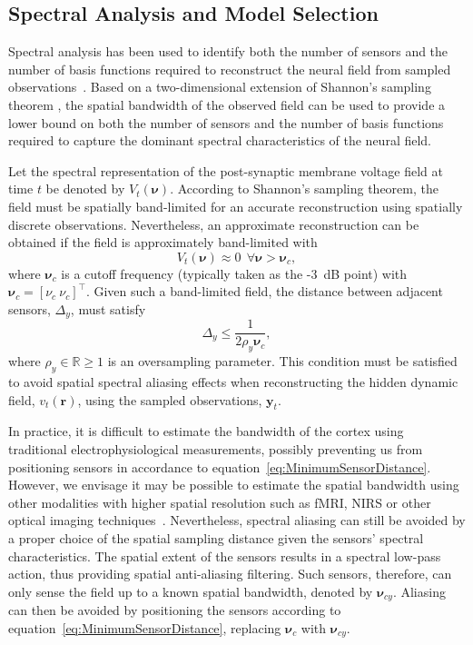 \documentclass[10pt]{article}
\begin{document}
\subsection{Spectral Analysis and Model Selection}\label{SpectralAnalysisSection} Spectral analysis has been used to identify both the number of sensors and the number of basis functions required to reconstruct the neural field from sampled observations~\cite{Sanner1992,Scerri2009}. Based on a two-dimensional extension of Shannon's sampling theorem \cite{Peterson1962}, the spatial bandwidth of the observed field can be used to provide a lower bound on both the number of sensors and the number of basis functions required to capture the dominant spectral characteristics of the neural field.

Let the spectral representation of the post-synaptic membrane voltage field at time $t$ be denoted by $V_t(\boldsymbol{\nu})$. According to Shannon's sampling theorem, the field must be spatially band-limited for an accurate reconstruction using spatially discrete observations. Nevertheless, an approximate reconstruction can be obtained if the field is approximately band-limited with 
\begin{equation}
	V_t(\boldsymbol{\nu}) \approx 0 ~ \ \forall \boldsymbol{\nu} > \boldsymbol{\nu}_c,
\end{equation}
where $\boldsymbol{\nu}_c$ is a cutoff frequency (typically taken as the -3~dB point) with $\boldsymbol{\nu}_c = [\nu_c ~ \nu_c]^\top$. Given such a band-limited field, the distance between adjacent sensors, $\Delta_y$, must satisfy 
\begin{equation}
	\label{eq:MinimumSensorDistance} \Delta_y \leq \frac{1}{2\rho_y\boldsymbol{\nu}_{c}}, 
\end{equation}
where $\rho_y \in \mathbb{R} \ge 1$ is an oversampling parameter. This condition must be satisfied to avoid spatial spectral aliasing effects when reconstructing the hidden dynamic field, $v_t(\mathbf{r})$, using the sampled observations, $\mathbf{y}_t$.

In practice, it is difficult to estimate the bandwidth of the cortex using traditional electrophysiological measurements, possibly preventing us from positioning sensors in accordance to equation~\ref{eq:MinimumSensorDistance}. However, we envisage it may be possible to estimate the spatial bandwidth using other modalities with higher spatial resolution such as fMRI, NIRS or other optical imaging techniques~\cite{Issa2000}. Nevertheless, spectral aliasing can still be avoided by a proper choice of the spatial sampling distance given the sensors' spectral characteristics. The spatial extent of the sensors results in a spectral low-pass action, thus providing spatial anti-aliasing filtering. Such sensors, therefore, can only sense the field up to a known spatial bandwidth, denoted by $\boldsymbol{\nu}_{cy}$. Aliasing can then be avoided by positioning the sensors according to equation~\ref{eq:MinimumSensorDistance}, replacing $\boldsymbol{\nu}_c$ with $\boldsymbol{\nu}_{cy}$.
\end{document}
